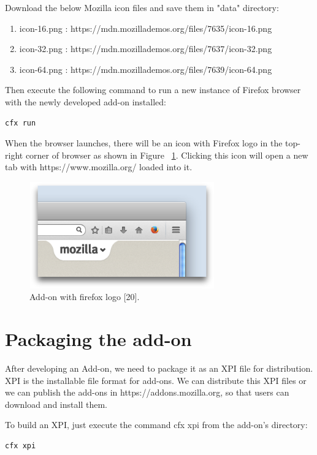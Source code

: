 Download the below Mozilla icon files and save them in "data" directory:
\begin{enumerate}
\item icon-16.png : https://mdn.mozillademos.org/files/7635/icon-16.png
\item icon-32.png : https://mdn.mozillademos.org/files/7637/icon-32.png
\item icon-64.png : https://mdn.mozillademos.org/files/7639/icon-64.png
\end{enumerate}
Then execute the following command to run a new instance of Firefox browser with the newly developed add-on installed:
\begin{lstlisting}[frame=none,numbers=none,mathescape=false]
cfx run
\end{lstlisting}
When the browser launches, there will be an icon with Firefox logo in the top-right corner of browser as shown in Figure ~\ref{fig:mozilla-button}. Clicking this icon will open a new tab with https://www.mozilla.org/ loaded into it.
\begin{figure}[h]
  \centering
      \includegraphics[width=8cm, height=4.6cm]{mozilla-button.png}
    \caption[Add-on with firefox logo]{Add-on with firefox logo [20].}
    \label{fig:mozilla-button}
\end{figure}

\section{Packaging the add-on}

After developing an Add-on, we need to package it as an XPI file for distribution. XPI is the installable file format for add-ons. We can distribute this XPI files or we can publish the add-ons in https://addons.mozilla.org, so that users can download and install them.

To build an XPI, just execute the command cfx xpi from the add-on's directory:
\begin{lstlisting}[frame=none,numbers=none,mathescape=false]
cfx xpi
\end{lstlisting}


